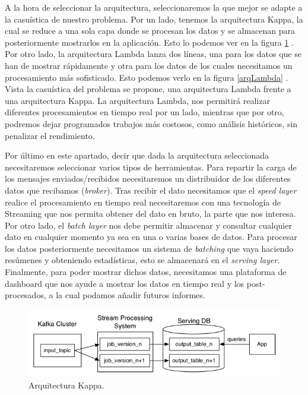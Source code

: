 A la hora de seleccionar la arquitectura, seleccionaremos la que mejor se
adapte a la casuística de nuestro problema. Por un lado, tenemos la
arquitectura Kappa, la cual se reduce a una sola capa donde se procesan los
datos y se almacenan para posteriormente mostrarlos en la aplicación. Esto
lo podemos ver en la figura \ref{arqKappa} \cite{LambdaKappa2}. Por otro
lado, la arquitectura Lambda lanza dos líneas, una para los datos que se
han de mostrar rápidamente y otra para los datos de los cuales necesitamos
un procesamiento más sofisticado. Esto podemos verlo en la figura
\ref{arqLambda} \cite{LambdaKappa}. Vista la casuística del problema se
propone, una arquitectura Lambda frente a una arquitectura Kappa. La
arquitectura Lambda, nos permitirá realizar diferentes procesamientos en
tiempo real por un lado, mientras que por otro, podremos dejar programados
trabajos más costosos, como análisis históricos, sin penalizar el
rendimiento.

Por último en este apartado, decir que dada la arquitectura seleccionada
necesitaremos seleccionar varios tipos de herramientas. Para repartir la
carga de los mensajes enviados/recibidos necesitaremos un distribuidor de
los diferentes datos que recibamos ({\em broker}). Tras recibir el dato
necesitamos que el {\em speed layer} realice el procesamiento en tiempo
real necesitaremos con una tecnología de Streaming que nos permita obtener
del dato en bruto, la parte que nos interesa. Por otro lado, el {\em batch
  layer} nos debe permitir almacenar y consultar cualquier dato en
cualquier momento ya sea en una o varias bases de datos. Para procesar los
datos posteriormente necesitamos un sistema de {\em batching} que vaya
haciendo resúmenes y obteniendo estadísticas, esto se almacenará en el {\em
  serving layer}. Finalmente, para poder mostrar dichos datos, necesitamos
una plataforma de dashboard que nos ayude a mostrar los datos en tiempo
real y los post-procesados, a la cual podamos añadir futuros informes.

\begin{figure}[htp]
\centering
\includegraphics[scale=0.70]{Imagenes/arq1.png}
\caption{Arquitectura Kappa.}
\label{arqKappa}
\end{figure}

